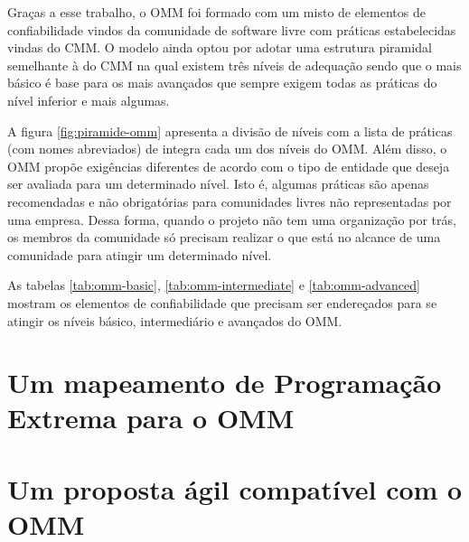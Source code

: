 Graças a esse trabalho, o OMM foi formado com um misto de elementos de
confiabilidade vindos da comunidade de software livre com práticas
estabelecidas vindas do CMM. O modelo ainda optou por adotar uma
estrutura piramidal semelhante à do CMM na qual existem três níveis de
adequação sendo que o mais básico é base para os mais avançados que
sempre exigem todas as práticas do nível inferior e mais algumas.

A figura \ref{fig:piramide-omm} apresenta a divisão de níveis com a
lista de práticas (com nomes abreviados) de integra cada um dos níveis
do OMM. Além disso, o OMM propõe exigências diferentes de acordo com o
tipo de entidade que deseja ser avaliada para um determinado
nível. Isto é, algumas práticas são apenas recomendadas e não
obrigatórias para comunidades livres não representadas por uma
empresa. Dessa forma, quando o projeto não tem uma organização por
trás, os membros da comunidade só precisam realizar o que está no
alcance de uma comunidade para atingir um determinado nível.


As tabelas \ref{tab:omm-basic}, \ref{tab:omm-intermediate} e
\ref{tab:omm-advanced} mostram os elementos de confiabilidade que
precisam ser endereçados para se atingir os níveis básico,
intermediário e avançados do OMM.


\section{Um mapeamento de Programação Extrema para o OMM}
\label{sec:xp-em-omm}


\section{Um proposta ágil compatível com o OMM}
\label{sec:openagile-em-omm}

